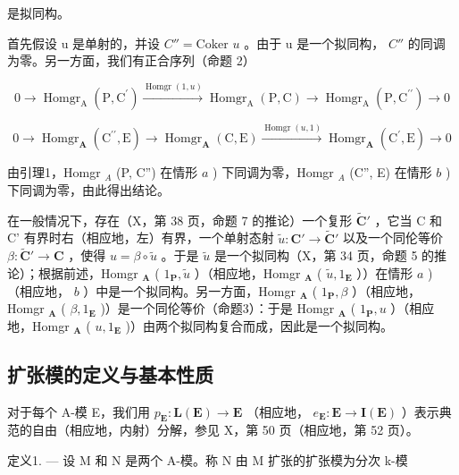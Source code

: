 是拟同构。

首先假设 u 是单射的，并设 \(C'' = \text{Coker } u\) 。由于 u 是一个拟同构， \(C''\) 的同调为零。另一方面，我们有正合序列（命题 2）

\[
0 \rightarrow \operatorname{Homgr} _ {\mathrm{A}} (\mathrm{P}, \mathrm{C} ^ {\prime}) \xrightarrow {\operatorname{Homgr} (1 , u)} \operatorname{Homgr} _ {\mathrm{A}} (\mathrm{P}, \mathrm{C}) \rightarrow \operatorname{Homgr} _ {\mathrm{A}} (\mathrm{P}, \mathrm{C} ^ {\prime \prime}) \rightarrow 0
\]

\[
0 \rightarrow \operatorname{Homgr} _ {\mathbf {A}} \left(\mathrm{C} ^ {\prime \prime}, \mathrm{E}\right)\rightarrow \operatorname{Homgr} _ {\mathbf {A}} (\mathrm{C}, \mathrm{E}) \xrightarrow {\operatorname{Homgr} (u , 1)} \operatorname{Homgr} _ {\mathbf {A}} \left(\mathrm{C} ^ {\prime}, \mathrm{E}\right)\rightarrow 0
\]

由引理1，Homgr \(_{A}\) (P, C'') 在情形 \(a\) ) 下同调为零，Homgr \(_{A}\) (C'', E) 在情形 \(b\) ) 下同调为零，由此得出结论。

在一般情况下，存在（X，第 38 页，命题 7 的推论）一个复形 \(\tilde{\mathbf{C}}'\) ，它当 C 和 C' 有界时右（相应地，左）有界，一个单射态射 \(\tilde{u}: \mathbf{C}' \to \tilde{\mathbf{C}}'\) 以及一个同伦等价 \(\beta: \tilde{\mathbf{C}}' \to \mathbf{C}\) ，使得 \(u = \beta \circ \tilde{u}\) 。于是 \(\tilde{u}\) 是一个拟同构（X，第 34 页，命题 5 的推论）；根据前述，Homgr \(_{\mathbf{A}}\) ( \(1_{\mathbf{P}}, \tilde{u}\) ）（相应地，Homgr \(_{\mathbf{A}}\) ( \(\tilde{u}, 1_{\mathbf{E}}\) ））在情形 \(a\) )（相应地， \(b\) ）中是一个拟同构。另一方面，Homgr \(_{\mathbf{A}}\) ( \(1_{\mathbf{P}}, \beta\) ）（相应地，Homgr \(_{\mathbf{A}}\) ( \(\beta, 1_{\mathbf{E}}\) )）是一个同伦等价（命题3）：于是 Homgr \(_{\mathbf{A}}\) ( \(1_{\mathbf{P}}, u\) ）（相应地，Homgr \(_{\mathbf{A}}\) ( \(u, 1_{\mathbf{E}}\) )）由两个拟同构复合而成，因此是一个拟同构。

\subsection{扩张模的定义与基本性质}

对于每个 A-模 E，我们用 \(p_{\mathbf{E}} : \mathbf{L}(\mathbf{E}) \to \mathbf{E}\) （相应地， \(e_{\mathbf{E}} : \mathbf{E} \to \mathbf{I}(\mathbf{E})\) ）表示典范的自由（相应地，内射）分解，参见 X，第 50 页（相应地，第 52 页）。

定义1. --- 设 M 和 N 是两个 A-模。称 N 由 M 扩张的扩张模为分次 k-模

